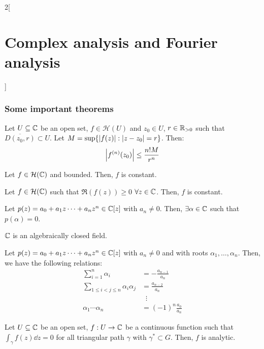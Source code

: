 \documentclass[../../../main.tex]{subfiles}
\begin{document}
\begin{multicols}{2}[\section{Complex analysis and Fourier analysis}]
  \subsubsection{Some important theorems}
  \begin{proposition}
    Let $U\subseteq\mathbb{C}$ be an open set, $f\in\mathcal{H}(U)$ and $z_0\in U$, $r\in\mathbb{R}_{>0}$ such that $\overline{D(z_0,r)}\subset U$. Let $M=\sup\{\abs{f(z)}:\abs{z-z_0}=r\}$. Then:
    $$\abs{f^{(n)}(z_0)}\leq\frac{n!M}{r^n}$$
  \end{proposition}
  \begin{theorem}
    Let $f\in\mathcal{H}(\mathbb{C})$ and bounded. Then, $f$ is constant.
  \end{theorem}
  \begin{corollary}
    Let $f\in\mathcal{H}(\mathbb{C})$ such that $\Re(f(z))\geq 0$ $\forall z\in\mathbb{C}$. Then, $f$ is constant.
  \end{corollary}
  \begin{theorem}
    Let $p(z)=a_0+a_1z\cdots+a_nz^n\in\mathbb{C}[z]$ with $a_n\ne 0$. Then, $\exists \alpha\in \mathbb{C}$ such that $p(\alpha)=0$.
  \end{theorem}
  \begin{corollary}
    $\mathbb{C}$ is an algebraically closed field.
  \end{corollary}
  \begin{proposition}
    Let $p(z)=a_0+a_1z\cdots+a_nz^n\in\mathbb{C}[z]$ with $a_n\ne 0$ and with roots $\alpha_1,\ldots,\alpha_n$. Then, we have the following relations:
    \begin{align*}
      \sum_{i=1}^n\alpha_i                   & =                    -\frac{a_{n-1}}{a_n}  \\
      \sum_{1\leq i<j\leq n}\alpha_i\alpha_j & =  \frac{a_{n-2}}{a_n}                     \\
                                             & \;\;\vdots                                 \\
      \alpha_1\cdots\alpha_n                 & =                  {(-1)}^n\frac{a_0}{a_n}
    \end{align*}
  \end{proposition}
  \begin{theorem}
    Let $U\subseteq\mathbb{C}$ be an open set, $f:U\rightarrow\mathbb{C}$ be a continuous function such that $\displaystyle \int_\gamma f(z)\dd{z}=0$ for all triangular path $\gamma$ with $\gamma^*\subset G$. Then, $f$ is analytic.

\end{theorem}
\end{multicols}
\end{document}
